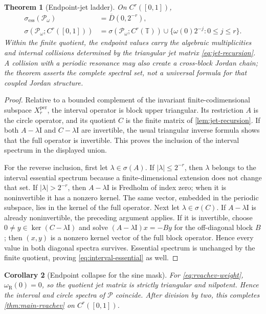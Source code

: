\documentclass[11pt,a4paper]{article}
\newtheorem{theorem}{Theorem}[section]
\newtheorem{corollary}[theorem]{Corollary}
\theoremstyle{definition}
\theoremstyle{remark}
\newcommand{\T}{\mathbb T}
\newcommand{\Dbar}[1]{\overline{D}(0,#1)}
\newcommand{\spec}{\sigma}
\newcommand{\spece}{\sigma_{\mathrm{ess}}}
\newcommand{\Pop}{\mathcal P}
\newcommand{\id}{\mathrm I}
\begin{document}
\begin{theorem}[Endpoint-jet ladder]
\label{thm:endpoint-ladder}
On $C^r([0,1])$,
\begin{align}
 \spece(\Pop_\omega)&=\Dbar{2^{-r}},
 \label{eq:interval-essential}\\
 \spec(\Pop_\omega;C^r([0,1]))
 &=\spec(\Pop_\omega;C^r(\T))
   \cup\{\omega(0)2^{-j}:0\le j\le r\}.
 \label{eq:interval-spectrum-general}
\end{align}
Within the finite quotient, the endpoint values carry the algebraic
multiplicities and internal collisions determined by the triangular jet
matrix \eqref{eq:jet-recursion}.  A collision with a periodic resonance may
also create a cross-block Jordan chain; the theorem asserts the complete
spectral set, not a universal formula for that coupled Jordan structure.
\end{theorem}
\begin{proof}
Relative to a bounded complement of the invariant finite-codimensional
subspace $X_r^{\mathrm{per}}$, the interval operator is block upper
triangular.  Its restriction $A$ is the circle operator, and its quotient
$C$ is the finite matrix of \cref{lem:jet-recursion}.  If both
$A-\lambda\id$ and $C-\lambda\id$ are invertible, the usual triangular
inverse formula shows that the full operator is invertible.  This proves the
inclusion of the interval spectrum in the displayed union.

For the reverse inclusion, first let $\lambda\in\spec(A)$.  If
$|\lambda|\le2^{-r}$, then $\lambda$ belongs to the interval essential
spectrum because a finite-dimensional extension does not change that set.
If $|\lambda|>2^{-r}$, then $A-\lambda\id$ is Fredholm of index zero; when it
is noninvertible it has a nonzero kernel.  The same vector, embedded in the
periodic subspace, lies in the kernel of the full operator.  Next let
$\lambda\in\spec(C)$.  If $A-\lambda\id$ is already noninvertible, the
preceding argument applies.  If it is invertible, choose
$0\ne y\in\ker(C-\lambda\id)$ and solve
$(A-\lambda\id)x=-By$ for the off-diagonal block $B$; then $(x,y)$ is a
nonzero kernel vector of the full block operator.  Hence every value in both
diagonal spectra survives.  Essential spectrum is unchanged by the finite
quotient, proving \eqref{eq:interval-essential} as well.
\end{proof}

\begin{corollary}[Endpoint collapse for the sine mask]
\label{cor:sine-interval}
For \eqref{eq:rvachev-weight}, $\omega_\mathrm{R}(0)=0$, so the quotient jet
matrix is strictly triangular and nilpotent.  Hence the interval and circle
spectra of $\Pop$ coincide.  After division by two, this completes
\cref{thm:main-rvachev} on $C^r([0,1])$.
\end{corollary}
\end{document}
